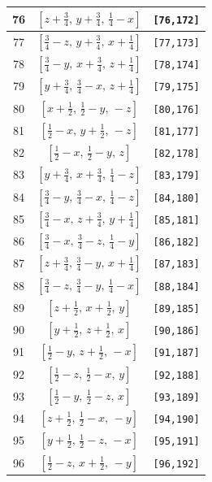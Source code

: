 \documentclass[fleqn,8pt]{jsarticle}
\begin{document}
\begin{longtable}{ccc}
76 & $\left[ z + \frac{3}{4},\, y + \frac{3}{4},\, \frac{1}{4} - x \right]$ & {\tt [76,172]} \\ \hline
77 & $\left[ \frac{3}{4} - z,\, y + \frac{3}{4},\, x + \frac{1}{4} \right]$ & {\tt [77,173]} \\ \hline
78 & $\left[ \frac{3}{4} - y,\, x + \frac{3}{4},\, z + \frac{1}{4} \right]$ & {\tt [78,174]} \\ \hline
79 & $\left[ y + \frac{3}{4},\, \frac{3}{4} - x,\, z + \frac{1}{4} \right]$ & {\tt [79,175]} \\ \hline
80 & $\left[ x + \frac{1}{2},\, \frac{1}{2} - y,\, - z \right]$ & {\tt [80,176]} \\ \hline
81 & $\left[ \frac{1}{2} - x,\, y + \frac{1}{2},\, - z \right]$ & {\tt [81,177]} \\ \hline
82 & $\left[ \frac{1}{2} - x,\, \frac{1}{2} - y,\, z \right]$ & {\tt [82,178]} \\ \hline
83 & $\left[ y + \frac{3}{4},\, x + \frac{3}{4},\, \frac{1}{4} - z \right]$ & {\tt [83,179]} \\ \hline
84 & $\left[ \frac{3}{4} - y,\, \frac{3}{4} - x,\, \frac{1}{4} - z \right]$ & {\tt [84,180]} \\ \hline
85 & $\left[ \frac{3}{4} - x,\, z + \frac{3}{4},\, y + \frac{1}{4} \right]$ & {\tt [85,181]} \\ \hline
86 & $\left[ \frac{3}{4} - x,\, \frac{3}{4} - z,\, \frac{1}{4} - y \right]$ & {\tt [86,182]} \\ \hline
87 & $\left[ z + \frac{3}{4},\, \frac{3}{4} - y,\, x + \frac{1}{4} \right]$ & {\tt [87,183]} \\ \hline
88 & $\left[ \frac{3}{4} - z,\, \frac{3}{4} - y,\, \frac{1}{4} - x \right]$ & {\tt [88,184]} \\ \hline
89 & $\left[ z + \frac{1}{2},\, x + \frac{1}{2},\, y \right]$ & {\tt [89,185]} \\ \hline
90 & $\left[ y + \frac{1}{2},\, z + \frac{1}{2},\, x \right]$ & {\tt [90,186]} \\ \hline
91 & $\left[ \frac{1}{2} - y,\, z + \frac{1}{2},\, - x \right]$ & {\tt [91,187]} \\ \hline
92 & $\left[ \frac{1}{2} - z,\, \frac{1}{2} - x,\, y \right]$ & {\tt [92,188]} \\ \hline
93 & $\left[ \frac{1}{2} - y,\, \frac{1}{2} - z,\, x \right]$ & {\tt [93,189]} \\ \hline
94 & $\left[ z + \frac{1}{2},\, \frac{1}{2} - x,\, - y \right]$ & {\tt [94,190]} \\ \hline
95 & $\left[ y + \frac{1}{2},\, \frac{1}{2} - z,\, - x \right]$ & {\tt [95,191]} \\ \hline
96 & $\left[ \frac{1}{2} - z,\, x + \frac{1}{2},\, - y \right]$ & {\tt [96,192]} \\
\end{longtable}
\end{document}

